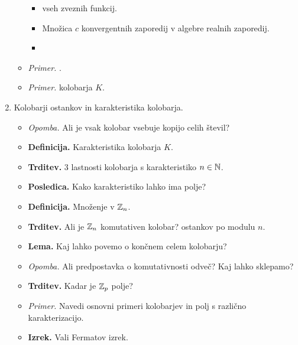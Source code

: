 \begin{enumerate}
\begin{itemize}
\begin{itemize}
            \item {} vseh zveznih funkcij.
            \item Množica $c$ konvergentnih zaporedij v algebre realnih zaporedij.
            \item 
        \end{itemize}
        \item \colorbox{yellow!30}{\emph{Primer.}} .
        \item \colorbox{yellow!30}{\emph{Primer.}}  kolobarja $K$.
    \end{itemize}

    \newpage
    \item Kolobarji ostankov in karakteristika kolobarja.
    \begin{itemize}
        \item \colorbox{yellow!30}{\emph{Opomba.}}  Ali je vsak kolobar vsebuje kopijo celih števil?
        \item \colorbox{purple!30}{\textbf{Definicija.}} Karakteristika kolobarja $K$.
        \item \colorbox{blue!30}{\textbf{Trditev.}} 3 lastnosti kolobarja s karakteristiko $n \in \mathbb{N}$.
        \item \colorbox{orange!30}{\textbf{Posledica.}} Kako karakteristiko lahko ima polje?
        \item \colorbox{purple!30}{\textbf{Definicija.}} Množenje v $\mathbb{Z}_n$.
        \item \colorbox{blue!30}{\textbf{Trditev.}} Ali je $\mathbb{Z}_n$ komutativen kolobar?  ostankov po modulu $n$.
        \item \colorbox{blue!30}{\textbf{Lema.}} Kaj lahko povemo o končnem celem kolobarju?
        \item \colorbox{yellow!30}{\emph{Opomba.}} Ali predpostavka o komutativnosti odveč? Kaj lahko sklepamo?
        \item \colorbox{blue!30}{\textbf{Trditev.}} Kadar je $\mathbb{Z}_p$ polje?
        \item \colorbox{yellow!30}{\emph{Primer.}} Navedi osnovni primeri kolobarjev in polj s različno karakterizacijo.
        \item \colorbox{blue!30}{\textbf{Izrek.}} Vali Fermatov izrek. 
    \end{itemize}


\end{enumerate}
